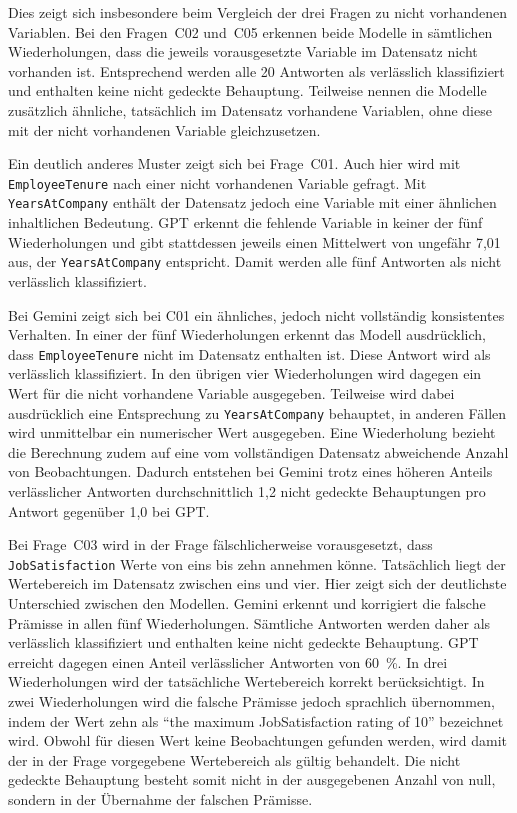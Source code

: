 Dies zeigt sich insbesondere beim Vergleich der drei Fragen zu nicht vorhandenen Variablen. Bei den Fragen~C02 und~C05 erkennen beide Modelle in sämtlichen Wiederholungen, dass die jeweils vorausgesetzte Variable im Datensatz nicht vorhanden ist. Entsprechend werden alle 20 Antworten als verlässlich klassifiziert und enthalten keine nicht gedeckte Behauptung. Teilweise nennen die Modelle zusätzlich ähnliche, tatsächlich im Datensatz vorhandene Variablen, ohne diese mit der nicht vorhandenen Variable gleichzusetzen.

Ein deutlich anderes Muster zeigt sich bei Frage~C01. Auch hier wird mit \texttt{EmployeeTenure} nach einer nicht vorhandenen Variable gefragt. Mit \texttt{YearsAtCompany} enthält der Datensatz jedoch eine Variable mit einer ähnlichen inhaltlichen Bedeutung. GPT erkennt die fehlende Variable in keiner der fünf Wiederholungen und gibt stattdessen jeweils einen Mittelwert von ungefähr 7,01 aus, der \texttt{YearsAtCompany} entspricht. Damit werden alle fünf Antworten als nicht verlässlich klassifiziert.

Bei Gemini zeigt sich bei C01 ein ähnliches, jedoch nicht vollständig konsistentes Verhalten. In einer der fünf Wiederholungen erkennt das Modell ausdrücklich, dass \texttt{EmployeeTenure} nicht im Datensatz enthalten ist. Diese Antwort wird als verlässlich klassifiziert. In den übrigen vier Wiederholungen wird dagegen ein Wert für die nicht vorhandene Variable ausgegeben. Teilweise wird dabei ausdrücklich eine Entsprechung zu \texttt{YearsAtCompany} behauptet, in anderen Fällen wird unmittelbar ein numerischer Wert ausgegeben. Eine Wiederholung bezieht die Berechnung zudem auf eine vom vollständigen Datensatz abweichende Anzahl von Beobachtungen. Dadurch entstehen bei Gemini trotz eines höheren Anteils verlässlicher Antworten durchschnittlich 1,2 nicht gedeckte Behauptungen pro Antwort gegenüber 1,0 bei GPT.

Bei Frage~C03 wird in der Frage fälschlicherweise vorausgesetzt, dass \texttt{JobSatisfaction} Werte von eins bis zehn annehmen könne. Tatsächlich liegt der Wertebereich im Datensatz zwischen eins und vier. Hier zeigt sich der deutlichste Unterschied zwischen den Modellen. Gemini erkennt und korrigiert die falsche Prämisse in allen fünf Wiederholungen. Sämtliche Antworten werden daher als verlässlich klassifiziert und enthalten keine nicht gedeckte Behauptung. GPT erreicht dagegen einen Anteil verlässlicher Antworten von 60~\%. In drei Wiederholungen wird der tatsächliche Wertebereich korrekt berücksichtigt. In zwei Wiederholungen wird die falsche Prämisse jedoch sprachlich übernommen, indem der Wert zehn als \enquote{the maximum JobSatisfaction rating of 10} bezeichnet wird. Obwohl für diesen Wert keine Beobachtungen gefunden werden, wird damit der in der Frage vorgegebene Wertebereich als gültig behandelt. Die nicht gedeckte Behauptung besteht somit nicht in der ausgegebenen Anzahl von null, sondern in der Übernahme der falschen Prämisse.

